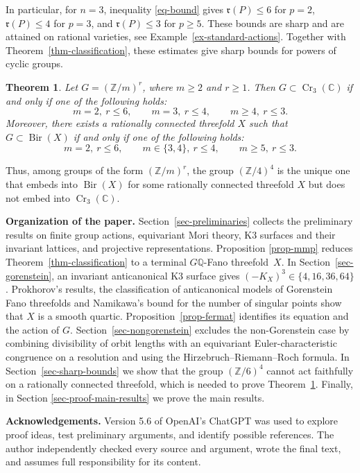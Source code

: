 \documentclass[10pt,oneside,reqno]{amsart}
\numberwithin{equation}{section}
\newtheorem{theorem}{Theorem}[section]
\theoremstyle{definition}
\newcommand{\Z}{\mathbb Z}
\newcommand{\Q}{\mathbb Q}
\newcommand{\C}{\mathbb C}
\newcommand{\Cr}{\operatorname{Cr}}
\begin{document}
In particular, for $n=3$, inequality \eqref{eq-bound} gives
$\mathfrak r(P)\leq6$ for $p=2$, $\mathfrak r(P)\leq4$ for $p=3$, and
$\mathfrak r(P)\leq3$ for $p\geq5$.  These bounds are sharp and are
attained on rational varieties, see Example~\ref{ex-standard-actions}. 
Together with Theorem~\ref{thm-classification}, these estimates give
sharp bounds for powers of cyclic groups.

\begin{theorem}
\label{thm-sharp-bounds}
Let $G=(\Z/m)^r$, where $m\geq2$ and $r\geq1$.  Then
$G\subset\Cr_3(\C)$ if and only if one of the following holds:
\[
 m=2,\ r\leq6,\quad\quad
 m=3,\ r\leq4,\quad\quad
 m\geq4,\ r\leq3.
\]
Moreover, there exists a rationally connected threefold $X$ such that
$G\subset\operatorname{Bir}(X)$ if and only if one of the following
holds:
\[
 m=2,\ r\leq6,\quad\quad
 m\in\{3,4\},\ r\leq4,\quad\quad
 m\geq5,\ r\leq3.
\]
\end{theorem}

Thus, among groups of the form $(\Z/m)^r$, the group $(\Z/4)^4$ is
the unique one that embeds into $\operatorname{Bir}(X)$ for some
rationally connected threefold $X$ but does not embed into
$\Cr_3(\C)$.

\textbf{Organization of the paper.}
Section~\ref{sec-preliminaries} collects the preliminary results on
finite group actions, equivariant Mori theory, K3 surfaces and their
invariant lattices, and projective representations.  Proposition
\ref{prop-mmp} reduces Theorem~\ref{thm-classification} to a terminal
$G\Q$-Fano threefold~$X$.  In Section~\ref{sec-gorenstein}, an
invariant anticanonical K3 surface gives
$(-K_X)^3\in\{4,16,36,64\}$.  Prokhorov's results, the classification
of anticanonical models of Gorenstein Fano threefolds and Namikawa's bound for the number of singular points show that $X$ is a smooth
quartic. Proposition~\ref{prop-fermat} identifies its equation and the
action of $G$.  Section~\ref{sec-nongorenstein} excludes the
non-Gorenstein case by combining divisibility of orbit lengths with an
equivariant Euler-characteristic congruence on a resolution and using the
Hirzebruch--Riemann--Roch formula.
In Section~\ref{sec-sharp-bounds} we show that the group $(\mathbb{Z}/6)^4$ cannot act faithfully on a rationally connected threefold, which is needed to prove Theorem~\ref{thm-sharp-bounds}. Finally, in Section \ref{sec-proof-main-results} we prove the main results.

\textbf{Acknowledgements.}
Version 5.6 of OpenAI's ChatGPT was used to explore proof
ideas, test preliminary arguments, and identify possible references.
The author independently checked every source and argument, wrote the
final text, and assumes full responsibility for its content.
\end{document}
